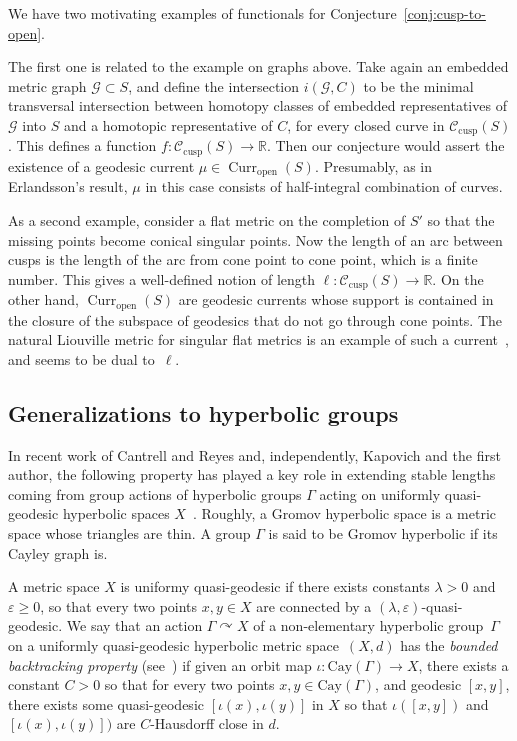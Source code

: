 \documentclass[11pt]{amsart}
\def\acts{\curvearrowright}
\numberwithin{equation}{section}
\numberwithin{figure}{section}
\theoremstyle{definition}
\theoremstyle{plain}
\DeclareMathOperator{\Curr}{Curr}
\renewcommand{\epsilon}{\varepsilon}
\newcommand{\Curves}{\mathcal{C}}
\def\acts{\curvearrowright}
\newcommand{\Cay}{\mathrm{Cay}}
\begin{document}
We have two motivating examples of functionals for
Conjecture~\ref{conj:cusp-to-open}.

The first one is related to the example on graphs above. Take again an
embedded metric graph $\mathcal{G} \subset S$, and define the
intersection $i(\mathcal{G},C)$ to be the minimal transversal
intersection between homotopy classes of embedded representatives of
$\mathcal{G}$ into $S$ and a homotopic representative of $C$, for
every closed curve in $\Curves_{\mathrm{cusp}}(S)$. This defines a
function $f \colon \Curves_{\mathrm{cusp}}(S) \to \mathbb{R}$. Then
our conjecture would assert the existence of a geodesic current
$\mu \in \Curr_{\mathrm{open}}(S)$. Presumably, as in Erlandsson's
result, $\mu$ in this case consists of half-integral combination of
curves.

As a second example, consider a flat metric on the completion of $S'$ so that the missing points become conical singular points. Now the length of an arc between cusps is the length of the arc from cone point to cone point, which is a finite number.
This gives a well-defined notion of length $\ell \colon \Curves_{\mathrm{cusp}}(S) \to \mathbb{R}$.
On the other hand,  $\Curr_{\mathrm{open}}(S)$ are geodesic currents
whose support is contained in the closure of the subspace of geodesics
that do not go through cone points. The natural Liouville metric for
singular flat metrics is an example of such a
current~\cite[Section~3.2]{BL17:RigidityFlat},
and seems to be dual
to~$\ell$.


\subsection{Generalizations to hyperbolic groups}
In recent work of Cantrell and Reyes and, independently, Kapovich and the first author, the following property has played a key role in extending stable lengths coming from group actions of hyperbolic groups $\Gamma$ acting on uniformly quasi-geodesic hyperbolic spaces $X$~\cite{KMG:BBP,CR25:Manhattan, CMGR26:GreenMetrics}.
Roughly, a Gromov hyperbolic space is a metric space whose triangles are thin. A group $\Gamma$ is said to be Gromov hyperbolic if its Cayley graph is.

A metric space $X$ is uniformy quasi-geodesic if there exists
constants $\lambda >0$ and $\epsilon \geq 0$, so that
every two points $x, y \in X$ are connected by a
$(\lambda,\epsilon)$-quasi-geodesic. We say that an action
$\Gamma \acts X$ of a non-elementary hyperbolic group~$\Gamma$ on a uniformly
quasi-geodesic hyperbolic metric space~$(X,d)$ has the \emph{bounded
  backtracking property} (see~\cite[Section~6.1]{CR25:Manhattan}) if given an orbit map
$\iota \colon \Cay(\Gamma) \to X$, there exists a constant $C>0$ so that
for every two points $x,y \in \Cay(\Gamma)$, and geodesic $[x,y]$,
there exists some quasi-geodesic $[\iota(x),\iota(y)]$ in $X$ so that
$\iota([x,y])$ and $[\iota(x),\iota(y)])$ are $C$-Hausdorff close in $d$.
\end{document}
